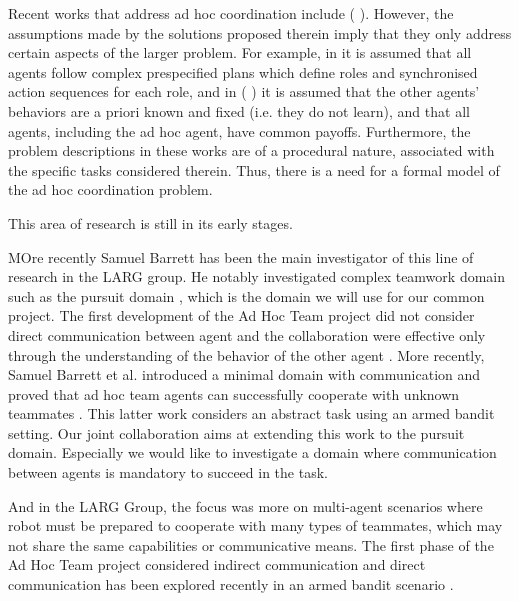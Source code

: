 Recent works that address ad hoc coordination include (\cite{bowling2005coordination} \cite{gil2006dynamically} \cite{stone2010ad}). However, the assumptions made by the solutions proposed therein imply that they only address certain aspects of the larger problem. For example, in  \cite{bowling2005coordination} \cite{gil2006dynamically} it is assumed that all agents follow complex prespecified plans which define roles and synchronised action sequences for each role, and in (\cite{stone2010teach} \cite{stone2013teaching}) it is assumed that the other agents' behaviors are a priori known and fixed (i.e. they do not learn), and that all agents, including the ad hoc agent, have common payoffs. Furthermore, the problem descriptions in these works are of a procedural nature, associated with the specific tasks considered therein. Thus, there is a need for a formal model of the ad hoc coordination problem.

This area of research is still in its early stages.


MOre recently Samuel Barrett has been the main investigator of this line of research in the LARG group. He notably investigated complex teamwork domain such as the pursuit domain \cite{barrett2011empirical}, which is the domain we will use for our common project. The first development of the Ad Hoc Team project did not consider direct communication between agent \cite{stone2010ad} \cite{barrett2011adhoc} and the collaboration were effective only through the understanding of the behavior of the other agent \cite{barrett2011empirical} \cite{barrett2013team}. More recently, Samuel Barrett et al. introduced a minimal domain with communication and proved that ad hoc team agents can successfully cooperate with unknown teammates \cite{barrett2013communicating}. This latter work considers an abstract task using an armed bandit setting. Our joint collaboration aims at extending this work to the pursuit domain. Especially we would like to investigate a domain where communication between agents is mandatory to succeed in the task. 

And in the LARG Group, the focus was more on multi-agent scenarios where robot must be prepared to cooperate with many types of teammates, which may not share the same capabilities or communicative means. The first phase of the Ad Hoc Team project considered indirect communication \cite{stone2010ad} \cite{barrett2011empirical} \cite{barrett2011adhoc} \cite{barrett2013team} and direct communication has been explored recently in an armed bandit scenario \cite{barrett2013communicating}. 

